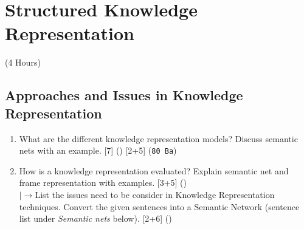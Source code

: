 \documentclass[12pt]{article}
\newcommand{\lb}{\\$\left|\rightarrow\right.$}
\begin{document}
\pagebreak
\section{Structured Knowledge Representation}
\begin{center}(4 Hours)\end{center}

  \subsection{Approaches and Issues in Knowledge Representation}
    \begin{enumerate}[topsep=0pt, noitemsep]
      \item What are the different knowledge representation models? Discuss semantic nets with an example. \hfill [7] () [2+5] (\texttt{80 Ba})

      \item How is a knowledge representation evaluated? Explain semantic net and frame representation with examples. \hfill [3+5] ()
        \lb List the issues need to be consider in Knowledge Representation techniques. Convert the given sentences into a Semantic Network (sentence list under \textit{Semantic nets} below). \hfill [2+6] ()
    \end{enumerate}
\end{document}
